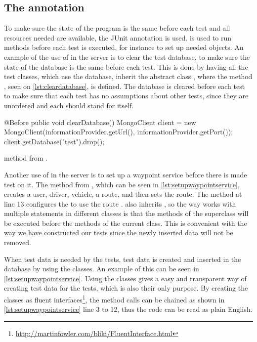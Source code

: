 \subsection{The  annotation}
To make sure the state of the program is the same before each test and all resources needed are available,
the JUnit annotation  is used.
 is used to run methods before each test is executed,
for instance to set up needed objects\cite{before_doc}.
An example of the use of  in the server is to clear the test database,
to make sure the state of the database is the same before each test.
This is done by having all the test classes, which use the database, inherit the abstract class ,
where the method , seen on \cref{lst:cleardatabase}, is defined.
The database is cleared before each test to make sure that each test has no assumptions about other tests,
since they are unordered and each should stand for itself.

\begin{listing}
    \begin{java2}
        @Before
        public void clearDatabase() {
            MongoClient client = new MongoClient(informationProvider.getUrl(), informationProvider.getPort());
            client.getDatabase("test").drop();
        }
    \end{java2}
    \caption{ method from .}
    \label{lst:cleardatabase}
\end{listing}

Another use of  in the server is to set up a waypoint service before there is made test on it.
The method  from ,
which can be seen in \cref{lst:setupwaypointservice},
creates a user, driver, vehicle, a route, and then sets the route.
The  method at line 13 configures the  to use the route .
 also inherits ,
so the way  works with multiple  statements in different classes
is that the  methods of the superclass will be executed before the  methods of the current class\cite{before_doc}.
This is convenient with the way we have constructed our tests since the newly inserted data will not be removed.

\bigskip

When test data is needed by the tests, test data is created and inserted in the database by using the  classes.
An example of this can be seen in \cref{lst:setupwaypointservice}.
Using the  classes gives a easy and transparent way of creating test data for the tests, which is also their only purpose.
By creating the  classes as fluent interfaces\footnote{\url{http://martinfowler.com/bliki/FluentInterface.html}}, the method calls can be chained as shown in \cref{lst:setupwaypointservice} line 3 to 12,
thus the code can be read as plain English.

